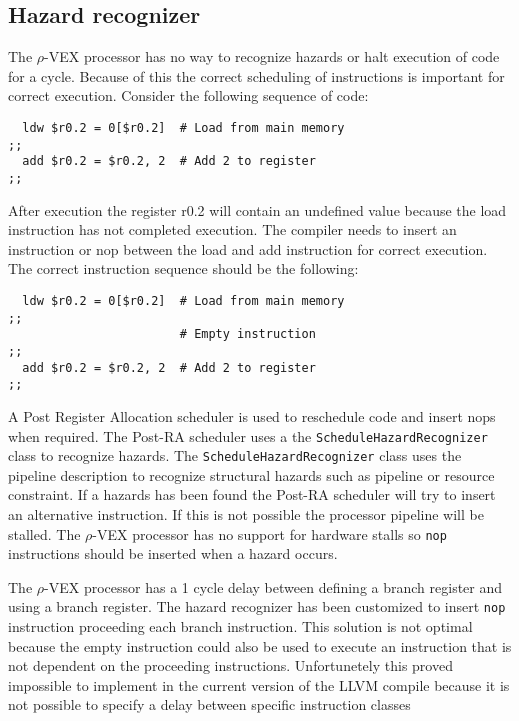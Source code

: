 \subsection{Hazard recognizer}
The $\rho$-VEX processor has no way to recognize hazards or halt execution of code for a cycle. Because of this the correct scheduling of instructions is important for correct execution. Consider the following sequence of code:

\begin{lstlisting}
  ldw $r0.2 = 0[$r0.2]  # Load from main memory
;;
  add $r0.2 = $r0.2, 2  # Add 2 to register
;;
\end{lstlisting}

After execution the register r0.2 will contain an undefined value because the load instruction has not completed execution. The compiler needs to insert an instruction or nop between the load and add instruction for correct execution. The correct instruction sequence should be the following:

\begin{lstlisting}
  ldw $r0.2 = 0[$r0.2]  # Load from main memory
;;
                        # Empty instruction
;;
  add $r0.2 = $r0.2, 2  # Add 2 to register
;;
\end{lstlisting}

A Post Register Allocation scheduler is used to reschedule code and insert nops when required. The Post-RA scheduler uses a the \texttt{ScheduleHazardRecognizer} class to recognize hazards. The \texttt{ScheduleHazardRecognizer} class uses the pipeline description to recognize structural hazards such as pipeline or resource constraint. If a hazards has been found the Post-RA scheduler will try to insert an alternative instruction. If this is not possible the processor pipeline will be stalled. The $\rho$-VEX processor has no support for hardware stalls so \texttt{nop} instructions should be inserted when a hazard occurs.

The $\rho$-VEX processor has a 1 cycle delay between defining a branch register and using a branch register. The hazard recognizer has been customized to insert \texttt{nop} instruction proceeding each branch instruction. This solution is not optimal because the empty instruction could also be used to execute an instruction that is not dependent on the proceeding instructions. Unfortunetely this proved impossible to implement in the current version of the LLVM compile because it is not possible to specify a delay between specific instruction classes

